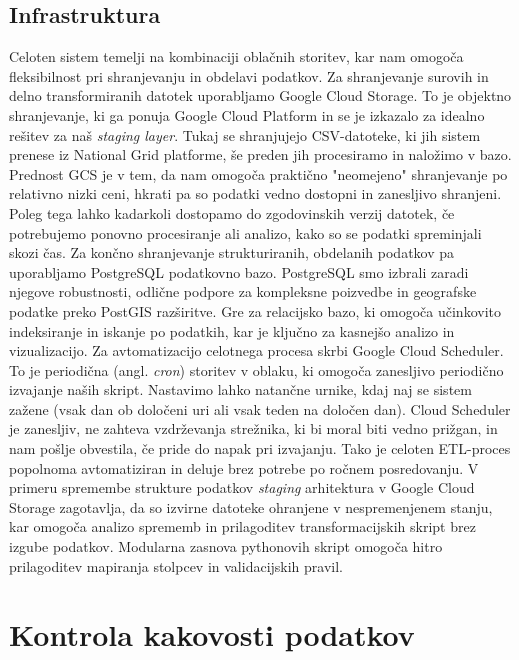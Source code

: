 \documentclass[a4paper,12pt,openright]{book}
\begin{document}
\subsection{Infrastruktura}
Celoten sistem temelji na kombinaciji oblačnih storitev, kar nam omogoča fleksibilnost pri shranjevanju in obdelavi podatkov.
Za shranjevanje surovih in delno transformiranih datotek uporabljamo Google Cloud Storage. To je objektno shranjevanje, ki ga ponuja Google Cloud Platform in se je izkazalo za idealno rešitev za naš \textit{staging layer}. Tukaj se shranjujejo CSV-datoteke, ki jih sistem prenese iz National Grid platforme, še preden jih procesiramo in naložimo v bazo. Prednost GCS je v tem, da nam omogoča praktično "neomejeno" shranjevanje po relativno nizki ceni, hkrati pa so podatki vedno dostopni in zanesljivo shranjeni. Poleg tega lahko kadarkoli dostopamo do zgodovinskih verzij datotek, če potrebujemo ponovno procesiranje ali analizo, kako so se podatki spreminjali skozi čas.
Za končno shranjevanje strukturiranih, obdelanih podatkov pa uporabljamo PostgreSQL podatkovno bazo. PostgreSQL smo izbrali zaradi njegove robustnosti, odlične podpore za kompleksne poizvedbe in geografske podatke preko PostGIS razširitve. Gre za relacijsko bazo, ki omogoča učinkovito indeksiranje in iskanje po podatkih, kar je ključno za kasnejšo analizo in vizualizacijo. 
Za avtomatizacijo celotnega procesa skrbi Google Cloud Scheduler. To je periodična (angl. \textit{cron}) storitev v oblaku, ki omogoča zanesljivo periodično izvajanje naših skript. Nastavimo lahko natančne urnike, kdaj naj se sistem zažene (vsak dan ob določeni uri ali vsak teden na določen dan). Cloud Scheduler je zanesljiv, ne zahteva vzdrževanja strežnika, ki bi moral biti vedno prižgan, in nam pošlje obvestila, če pride do napak pri izvajanju. Tako je celoten ETL-proces popolnoma avtomatiziran in deluje brez potrebe po ročnem posredovanju. V primeru spremembe strukture podatkov \textit{staging} arhitektura v Google Cloud Storage zagotavlja, da so izvirne datoteke ohranjene v nespremenjenem stanju, kar omogoča analizo sprememb in prilagoditev transformacijskih skript brez izgube podatkov. Modularna zasnova pythonovih skript omogoča hitro prilagoditev mapiranja stolpcev in validacijskih pravil.


\section{Kontrola kakovosti podatkov}
\end{document}
